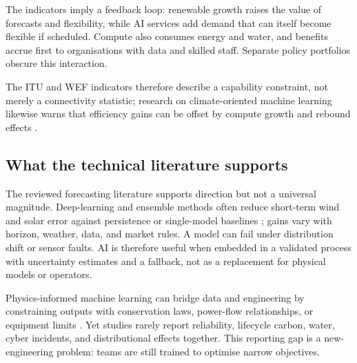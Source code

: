 \documentclass[12pt]{article}
\begin{document}
The indicators imply a feedback loop: renewable growth raises the value of forecasts and flexibility, while AI services add demand that can itself become flexible if scheduled. Compute also consumes energy and water, and benefits accrue first to organisations with data and skilled staff. Separate policy portfolios obscure this interaction.

The ITU and WEF indicators therefore describe a capability constraint, not merely a connectivity statistic; research on climate-oriented machine learning likewise warns that efficiency gains can be offset by compute growth and rebound effects \citep{itu2023,wef2023,kaack2022,strubell2019,rolnick2022}.

\subsection{What the technical literature supports}
The reviewed forecasting literature supports direction but not a universal magnitude. Deep-learning and ensemble methods often reduce short-term wind and solar error against persistence or single-model baselines \citep{wang2019,hong2020}; gains vary with horizon, weather, data, and market rules. A model can fail under distribution shift or sensor faults. AI is therefore useful when embedded in a validated process with uncertainty estimates and a fallback, not as a replacement for physical models or operators.

Physics-informed machine learning can bridge data and engineering by constraining outputs with conservation laws, power-flow relationships, or equipment limits \citep{karniadakis2021}. Yet studies rarely report reliability, lifecycle carbon, water, cyber incidents, and distributional effects together. This reporting gap is a new-engineering problem: teams are still trained to optimise narrow objectives.
\end{document}
